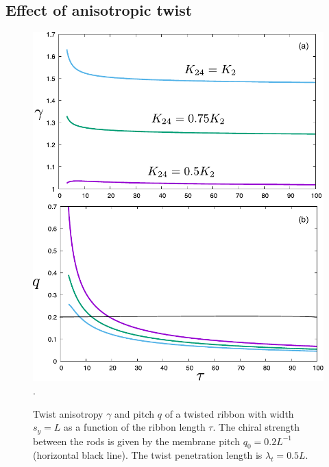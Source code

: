 


\subsection{Effect of anisotropic twist} 

\begin{figure}
\begin{center}
\includegraphics[width=  0.5 \columnwidth]{figures/chapter-5/raniso}.
\caption{ \label{fig3} Twist anisotropy $\gamma$ and pitch $q$ of a twisted ribbon with width $s_{y} = L$ as a function of the ribbon length $\tau$. The chiral strength between the rods is given by the membrane pitch $q_{0} = 0.2L^{-1}$ (horizontal black line). The twist penetration length is $\lambda_{t} = 0.5L $.   }
\end{center}
\end{figure}


